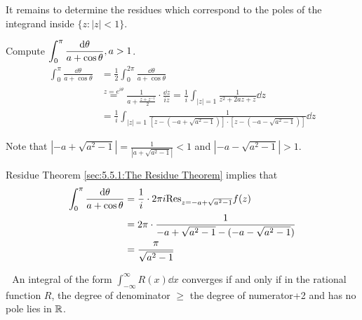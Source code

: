     It remains to determine the residues which correspond to the poles of the integrand inside  $ \{z:|z|<1\} $.
    \begin{example}
        Compute  $ \displaystyle\int_0^\pi\frac{\mathrm{d} \theta }{a+\cos\theta},a>1 $. 
        \begin{equation*}
            \begin{aligned}
                \int_0^\pi \frac{\dd \theta}{a+\cos\theta   }&=\frac{1 }{2}\int_0^{2\pi }\frac{\dd \theta}{a+\cos\theta}\\
                &\overset{z=e^{i\theta }}{=}\frac{1}{a+\frac{z+z^{-1}}{2}}\cdot\frac{\dd z }{iz}=\frac{1 }{i }\int_{|z|=1}\frac{1 }{z^2+2az+z}\dd z\\
                &=\frac{1 }{i }\int_{|z|=1}\frac{1}{\left[z-(-a+\sqrt{a^2-1})\right]\cdot\left[z-(-a-\sqrt{a^2-1})\right]}\dd z
            \end{aligned}
        \end{equation*}
        
        Note that  $ |-a+\sqrt{a^2-1}|=\frac{1 }{|a+\sqrt{a^2-1}|}<1 $ and  $ |-a-\sqrt{a^2-1}|>1 $.

        Residue Theorem \ref{sec:5.5.1:The Residue Theorem} implies that 
        \begin{align*}
            \int_0^\pi \frac{\mathrm{d} \theta }{a+\cos\theta}&=\frac{1 }{i }\cdot 2\pi i\mathrm{Res}_{z=-a+\sqrt{a^2-1}}f(z)\\
            &=2\pi \cdot \frac{1}{-a+\sqrt{a^2-1}-(-a-\sqrt{a^2-1})}\\
            &=\frac{\pi    }{\sqrt{a^2-1}}
        \end{align*}
    \end{example} 
    \noindent{}\,\,\,\,An integral of the form  $ \int_{-\infty}^\infty R(x)\dd x $ converges if and only if in the rational function  $ R $, the degree of denominator  $ \geq $  the degree of numerator+2 and has no pole lies in  $ \mathbb R $.
    
\begin{figure}[!h]
    \centering
\end{figure}

